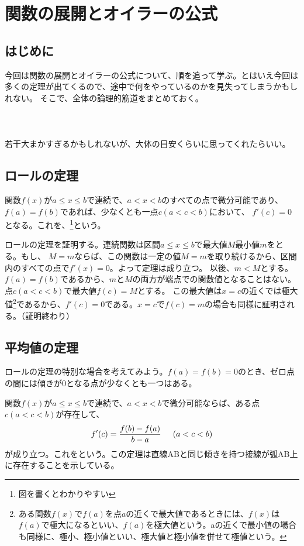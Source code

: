 \documentclass[a4j,dvipdfmx]{jsarticle}
\begin{document}
\section*{関数の展開とオイラーの公式}
\subsection{はじめに}
今回は関数の展開とオイラーの公式について、順を追って学ぶ。とはいえ今回は多くの定理が出てくるので、途中で何をやっているのかを見失ってしまうかもしれない。
そこで、全体の論理的筋道をまとめておく。\\\\
\\\\
若干大まかすぎるかもしれないが、大体の目安くらいに思ってくれたらいい。
\subsection{ロールの定理}
関数$f(x)$が$a\leq x\leq b$で連続で、$a<x<b$のすべての点で微分可能であり、$f(a)=f(b)$であれば、少なくとも一点$c(a<c<b)$において、
$f'(c)=0$となる。これを、\footnote{図を書くとわかりやすい}という。

ロールの定理を証明する。連続関数は区間$a\leq x \leq b$で最大値$M$最小値$m$をとる。もし、
$M=m$ならば、この関数は一定の値$M=m$を取り続けるから、区間内のすべての点で$f'(x)=0$。よって定理は成り立つ。
以後、$m<M$とする。$f(a)=f(b)$であるから、$m$と$M$の両方が端点での関数値となることはない。点$c(a<c<b)$で最大値$f(c)=M$とする。
この最大値は$x=c$の近くでは極大値\footnote{ある関数$f(x)$で$f(a)を$点$a$の近くで最大値であるときには、$f(x)$は$f(a)$で極大になるといい、$f(a)$を極大値という。aの近くで最小値の場合も同様に、極小、極小値といい、極大値と極小値を併せて極値という。}であるから、$f'(c)=0$である。$x=c$で$f(c)=m$の場合も同様に証明される。（証明終わり）
\subsection{平均値の定理}
ロールの定理の特別な場合を考えてみよう。$f(a)=f(b)=0$のとき、ゼロ点の間には傾きが0となる点が少なくとも一つはある。

関数$f(x)$が$a\leq x\leq b$で連続で、$a<x<b$で微分可能ならば、ある点$c(a<c<b)$が存在して、
\begin{equation}
    f'(c)=\frac{f(b)-f(a)}{b-a}\hspace{5mm}(a<c<b)
\end{equation}
が成り立つ。これをという。この定理は直線ABと同じ傾きを持つ接線が弧AB上に存在することを示している。
\end{document}
